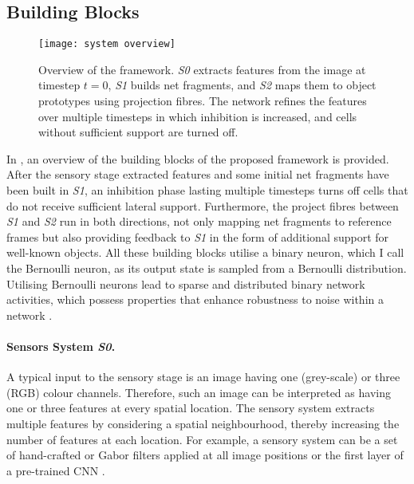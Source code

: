 \subsection{Building Blocks}
\begin{figure}[h]
    \centering
    \texttt{[image: system overview]}
    \caption[Overview of the framework]{Overview of the framework. \emph{S0} extracts features from the image at timestep $t=0$, \emph{S1} builds net fragments, and \emph{S2} maps them to object prototypes using projection fibres. The network refines the features over multiple timesteps in which inhibition is increased, and cells without sufficient support are turned off.}
\end{figure}

In , an overview of the building blocks of the proposed framework is provided. After the sensory stage extracted features and some initial net fragments have been built in \emph{S1}, an inhibition phase  lasting multiple timesteps turns off cells that do not receive sufficient lateral support. Furthermore, the project fibres  between \emph{S1} and \emph{S2} run in both directions, not only mapping net fragments to reference frames but also providing feedback to \emph{S1} in the form of additional support for well-known objects.
All these building blocks utilise a binary neuron, which I call the Bernoulli neuron, as its output state is sampled from a Bernoulli distribution.
Utilising Bernoulli neurons lead to sparse and distributed binary network activities, which possess properties that enhance robustness to noise within a network .

\paragraph{Sensors System \emph{S0}.} A typical input to the sensory stage is an image having one (grey-scale) or three (RGB) colour channels. Therefore, such an image can be interpreted as having one or three features at every spatial location.
The sensory system extracts multiple features by considering a spatial neighbourhood, thereby increasing the number of features at each location.
For example, a sensory system can be a set of hand-crafted or Gabor filters  applied at all image positions or the first layer of a pre-trained CNN .

